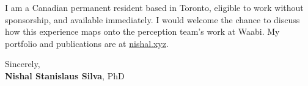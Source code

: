 \documentclass[11pt]{article}
\newcommand{\clName}{Nishal Stanislaus Silva}
\newcommand{\clCompany}{Waabi}
\newcommand{\clTeam}{the perception team}
\begin{document}
I am a Canadian permanent resident based in Toronto, eligible to work without sponsorship, and available immediately. I would welcome the chance to discuss how this experience maps onto \clTeam{}'s work at \clCompany{}. My portfolio and publications are at \href{https://nishal.xyz}{nishal.xyz}.

\vspace{12pt}
Sincerely,\\[2pt]
\textbf{\clName}, PhD
\end{document}

